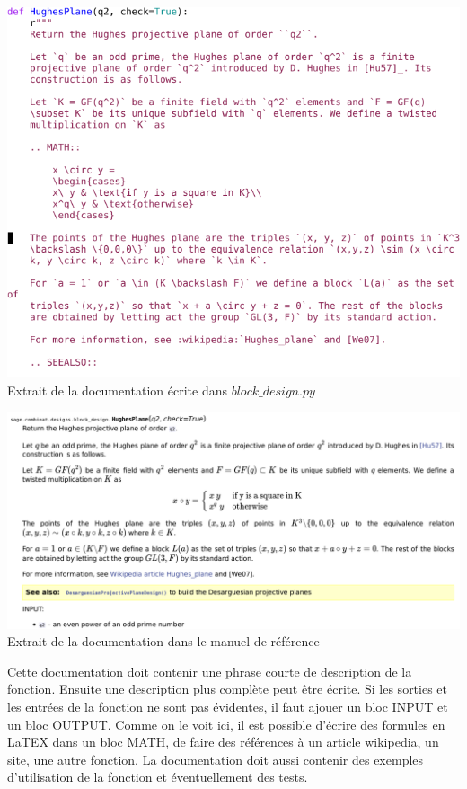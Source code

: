 \documentclass[a4paper]{article}
\begin{document}
\begin{center}
\includegraphics[scale=0.5]{hughesdoc.png}\\
  Extrait de la documentation écrite dans $block\_design.py$\vspace{1\baselineskip}

  \includegraphics[scale=0.5]{hughesdocmanual.png}
  Extrait de la documentation dans le manuel de référence
\end{center}
Cette documentation doit contenir une phrase courte de description de la fonction. Ensuite une description plus complète peut être écrite. Si les sorties et les entrées de la fonction ne sont pas évidentes, il faut ajouer un bloc INPUT et un bloc OUTPUT. Comme on le voit ici, il est possible d'écrire des formules en LaTEX dans un bloc MATH, de faire des références à un article wikipedia, un site, une autre fonction. La documentation doit aussi contenir des exemples d'utilisation de la fonction et éventuellement des tests.\\
\end{document}
